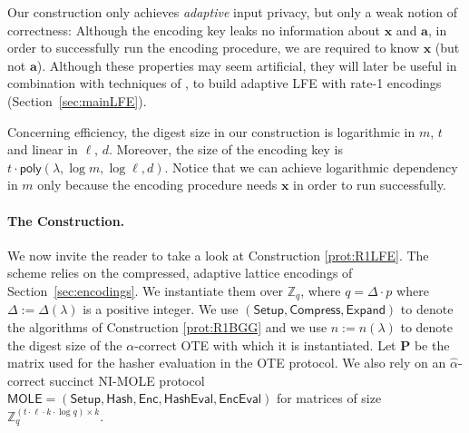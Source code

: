 \documentclass{article}
\newcommand{\MOLE}{\mathsf{MOLE}}
\newcommand{\Z}{\mathbb{Z}}
\newcommand{\poly}{\mathsf{poly}}
\renewcommand{\sec}{\ensuremath{\lambda}}
\newcommand{\Compress}{\mathsf{Compress}}
\newcommand{\algofont}[1]{\ensuremath{\mathsf{#1}}}
\newcommand{\Enc}{{\algofont{Enc}}}
\newcommand{\Setup}{{\algofont{Setup}}}
\newcommand{\Eval}{\algofont{Eval}\xspace}
\newcommand{\Hash}{{\algofont{Hash}}}
\newcommand{\Expand}{\algofont{Expand}}
\newcommand{\secref}[1]{Section~\ref{sec:#1}}
\begin{document}
Our construction only achieves \emph{adaptive} input privacy, but only a weak notion of correctness: Although the encoding key leaks no information about $\mathbf{x}$ and $\mathbf{a}$, in order to successfully run the encoding procedure, we are required to know $\mathbf{x}$ (but not $\mathbf{a}$). Although these properties may seem artificial, they will later be useful in combination with techniques of \cite{TCC:BTVW17}, to build adaptive LFE with rate-1 encodings (Section~\ref{sec:mainLFE}).

Concerning efficiency, the digest size in our construction is logarithmic in $m$, $t$ and linear in $\ell$, $d$. Moreover, the size of the encoding key is $t\cdot \poly(\sec, \log m, \log \ell, d)$. Notice that we can achieve logarithmic dependency in $m$ only because the encoding procedure needs $\mathbf{x}$ in order to run successfully. 

\paragraph{The Construction.} We now invite the reader to take a look at Construction \ref{prot:R1LFE}. The scheme relies on the compressed, adaptive lattice encodings of \secref{encodings}. We instantiate them over $\Z_q$, where $q=\Delta\cdot p$ where $\Delta:=\Delta(\sec)$ is a positive integer. We use $(\Setup, \Compress, \Expand)$ to denote the algorithms of Construction \ref{prot:R1BGG} and we use $n:=n(\sec)$ to denote the digest size of the $\alpha$-correct OTE with which it is instantiated. Let $\mathbf{P}$ be the matrix used for the hasher evaluation in the OTE protocol. We also rely on an $\hat{\alpha}$-correct succinct NI-MOLE protocol $\MOLE=(\Setup, \Hash, \Enc, \Hash\Eval, \Enc\Eval)$ for matrices of size $\Z_q^{(t\cdot \ell\cdot k\cdot \log q)\times k}$.
\end{document}
